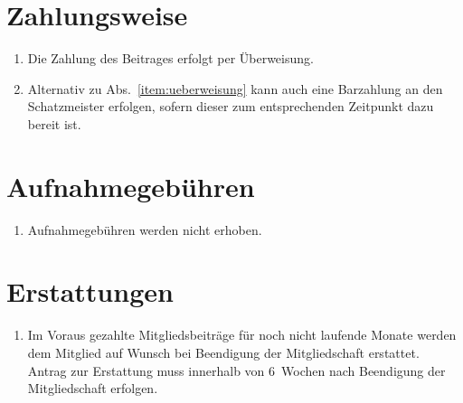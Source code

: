 \documentclass[a4paper,12pt]{scrartcl}
\begin{document}
\section{Zahlungsweise}
\begin{enumerate}
  \item\label{item:ueberweisung} Die Zahlung des Beitrages erfolgt per Überweisung.
  \item Alternativ zu Abs.~\ref{item:ueberweisung} kann auch eine Barzahlung an den
    Schatzmeister erfolgen, sofern dieser zum entsprechenden Zeitpunkt dazu
    bereit ist.
\end{enumerate}

\section{Aufnahmegebühren}
\begin{enumerate}
  \item Aufnahmegebühren werden nicht erhoben.
\end{enumerate}

\section{Erstattungen}
\begin{enumerate}
  \item Im Voraus gezahlte Mitgliedsbeiträge für noch nicht laufende Monate
    werden dem Mitglied auf Wunsch bei Beendigung der Mitgliedschaft erstattet.
    Antrag zur Erstattung muss innerhalb von 6~Wochen nach Beendigung der
    Mitgliedschaft erfolgen.
\end{enumerate}
\end{document}

